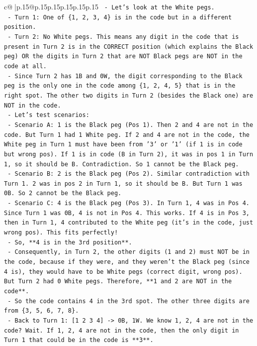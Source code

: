 \documentclass{article}
\begin{document}
{\begin{supertabular}{c@{$\;$}|p{.15\linewidth}@{}p{.15\linewidth}p{.15\linewidth}p{.15\linewidth}p{.15\linewidth}p{.15\linewidth}}
{{{\texttt{    {-} Let's look at the White pegs.} \\
\texttt{      {-} Turn 1: One of \{1, 2, 3, 4\} is in the code but in a different position.} \\
\texttt{      {-} Turn 2: No White pegs. This means any digit in the code that is present in Turn 2 is in the CORRECT position (which explains the Black peg) OR the digits in Turn 2 that are NOT Black pegs are NOT in the code at all.} \\
\texttt{      {-} Since Turn 2 has 1B and 0W, the digit corresponding to the Black peg is the only one in the code among \{1, 2, 4, 5\} that is in the right spot. The other two digits in Turn 2 (besides the Black one) are NOT in the code.} \\
\texttt{      {-} Let's test scenarios:} \\
\texttt{        {-} Scenario A: 1 is the Black peg (Pos 1). Then 2 and 4 are not in the code. But Turn 1 had 1 White peg. If 2 and 4 are not in the code, the White peg in Turn 1 must have been from '3' or '1' (if 1 is in code but wrong pos). If 1 is in code (B in Turn 2), it was in pos 1 in Turn 1, so it should be B. Contradiction. So 1 cannot be the Black peg.} \\
\texttt{        {-} Scenario B: 2 is the Black peg (Pos 2). Similar contradiction with Turn 1. 2 was in pos 2 in Turn 1, so it should be B. But Turn 1 was 0B. So 2 cannot be the Black peg.} \\
\texttt{        {-} Scenario C: 4 is the Black peg (Pos 3). In Turn 1, 4 was in Pos 4. Since Turn 1 was 0B, 4 is not in Pos 4. This works. If 4 is in Pos 3, then in Turn 1, 4 contributed to the White peg (it's in the code, just wrong pos). This fits perfectly!} \\
\texttt{        {-} So, **4 is in the 3rd position**.} \\
\texttt{        {-} Consequently, in Turn 2, the other digits (1 and 2) must NOT be in the code, because if they were, and they weren't the Black peg (since 4 is), they would have to be White pegs (correct digit, wrong pos). But Turn 2 had 0 White pegs. Therefore, **1 and 2 are NOT in the code**.} \\
\texttt{        {-} So the code contains 4 in the 3rd spot. The other three digits are from \{3, 5, 6, 7, 8\}.} \\
\texttt{        {-} Back to Turn 1: {[}1 2 3 4{]} {-}> 0B, 1W. We know 1, 2, 4 are not in the code? Wait. If 1, 2, 4 are not in the code, then the only digit in Turn 1 that could be in the code is **3**.} \\
}}}
\end{supertabular}}
\end{document}
